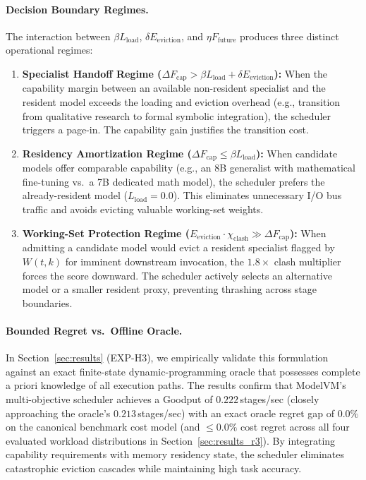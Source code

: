 \paragraph{Decision Boundary Regimes.}
The interaction between $\beta L_{\text{load}}$, $\delta E_{\text{eviction}}$, and $\eta F_{\text{future}}$ produces three distinct operational regimes:
\begin{enumerate}
    \item \textbf{Specialist Handoff Regime ($\Delta F_{\text{cap}} > \beta L_{\text{load}} + \delta E_{\text{eviction}}$):} When the capability margin between an available non-resident specialist and the resident model exceeds the loading and eviction overhead (e.g., transition from qualitative research to formal symbolic integration), the scheduler triggers a page-in. The capability gain justifies the transition cost.
    \item \textbf{Residency Amortization Regime ($\Delta F_{\text{cap}} \le \beta L_{\text{load}}$):} When candidate models offer comparable capability (e.g., an 8B generalist with mathematical fine-tuning vs.\ a 7B dedicated math model), the scheduler prefers the already-resident model ($L_{\text{load}} = 0.0$). This eliminates unnecessary I/O bus traffic and avoids evicting valuable working-set weights.
    \item \textbf{Working-Set Protection Regime ($E_{\text{eviction}} \cdot \chi_{\text{clash}} \gg \Delta F_{\text{cap}}$):} When admitting a candidate model would evict a resident specialist flagged by $W(t, k)$ for imminent downstream invocation, the $1.8\times$ clash multiplier forces the score downward. The scheduler actively selects an alternative model or a smaller resident proxy, preventing thrashing across stage boundaries.
\end{enumerate}

\paragraph{Bounded Regret vs.\ Offline Oracle.}
In Section~\ref{sec:results} (EXP-H3), we empirically validate this formulation against an exact finite-state dynamic-programming oracle that possesses complete a priori knowledge of all execution paths. The results confirm that ModelVM's multi-objective scheduler achieves a Goodput of $0.222$\,stages/sec (closely approaching the oracle's $0.213$\,stages/sec) with an exact oracle regret gap of $0.0\%$ on the canonical benchmark cost model (and $\le 0.0\%$ cost regret across all four evaluated workload distributions in Section~\ref{sec:results_r3}). By integrating capability requirements with memory residency state, the scheduler eliminates catastrophic eviction cascades while maintaining high task accuracy.
